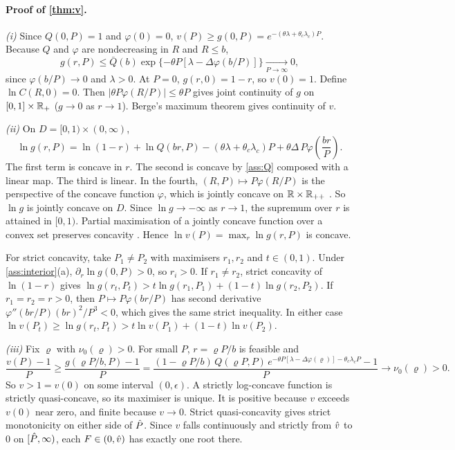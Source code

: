 \paragraph{Proof of \cref{thm:v}.}
\emph{(i)} Since $Q(0,P)=1$ and $\varphi(0)=0$, $v(P)\ge g(0,P)=e^{-(\theta\lambda+\theta_c\lambda_c)P}$. Because $Q$ and $\varphi$ are nondecreasing in $R$ and $R\le b$,
\[
g(r,P)\le \bar Q(b)\exp\{-\theta P[\lambda-\Delta\varphi(b/P)]\}\xrightarrow[P\to\infty]{}0,
\]
since $\varphi(b/P)\to0$ and $\lambda>0$. At $P=0$, $g(r,0)=1-r$, so $v(0)=1$. Define $\ln C(R,0)=0$. Then $|\theta P\varphi(R/P)|\le\theta P$ gives joint continuity of $g$ on $[0,1]\times\mathbb{R}_+$ ($g\to0$ as $r\to1$). Berge's maximum theorem gives continuity of $v$.

\emph{(ii)} On $D=[0,1)\times(0,\infty)$,
\[
\ln g(r,P)=\ln(1-r)+\ln Q(br,P)-(\theta\lambda+\theta_c\lambda_c) P+\theta\Delta\,P\varphi\!\left(\frac{br}{P}\right).
\]
The first term is concave in $r$. The second is concave by \cref{ass:Q}
composed with a linear map. The third is linear. In the fourth, $(R,P)\mapsto
P\varphi(R/P)$ is the perspective of the concave function $\varphi$, which is
jointly concave on $\mathbb{R}\times\mathbb{R}_{++}$ \citep[\S3.2.6]{boydvandenberghe2004}. So
$\ln g$ is jointly concave on $D$. Since $\ln g\to-\infty$ as $r\to1$, the
supremum over $r$ is attained in $[0,1)$. Partial maximisation of a jointly
concave function over a convex set preserves concavity
\citep[\S3.2.5]{boydvandenberghe2004}. Hence $\ln v(P)=\max_r\ln g(r,P)$ is concave.

For strict concavity, take $P_1\neq P_2$ with maximisers $r_1,r_2$ and $t\in(0,1)$. Under \cref{ass:interior}(a), $\partial_r\ln g(0,P)>0$, so $r_i>0$. If $r_1\neq r_2$, strict concavity of $\ln(1-r)$ gives
$\ln g(r_t,P_t)>t\ln g(r_1,P_1)+(1-t)\ln g(r_2,P_2)$. If $r_1=r_2=r>0$, then $P\mapsto P\varphi(br/P)$ has second derivative $\varphi''(br/P)(br)^2/P^3<0$, which gives the same strict inequality. In either case $\ln v(P_t)\ge\ln g(r_t,P_t)>t\ln v(P_1)+(1-t)\ln v(P_2)$.

\emph{(iii)} Fix $\varrho$ with $\nu_0(\varrho)>0$. For small $P$, $r=\varrho P/b$ is feasible and
\[
\frac{v(P)-1}{P}\ge\frac{g(\varrho P/b,P)-1}{P}
=\frac{(1-\varrho P/b)\,Q(\varrho P,P)\,e^{-\theta P[\lambda-\Delta\varphi(\varrho)]-\theta_c\lambda_cP}-1}{P}\longrightarrow \nu_0(\varrho)>0 .
\]
So $v>1=v(0)$ on some interval $(0,\epsilon)$. A strictly log-concave function is strictly quasi-concave, so its maximiser is unique. It is positive because $v$ exceeds $v(0)$ near zero, and finite because $v\to0$. Strict quasi-concavity gives strict monotonicity on either side of $\hat P$. Since $v$ falls continuously and strictly from $\hat v$ to $0$ on $[\hat P,\infty)$, each $F\in(0,\hat v)$ has exactly one root there.

